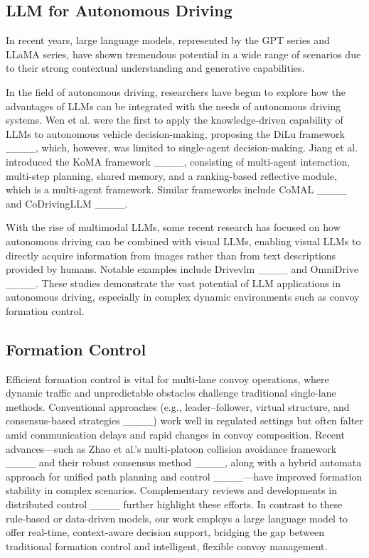 \subsection{LLM for Autonomous Driving} In recent years, large language models, represented by the GPT series and LLaMA series, have shown tremendous potential in a wide range of scenarios due to their strong contextual understanding and generative capabilities.

In the field of autonomous driving, researchers have begun to explore how the advantages of LLMs can be integrated with the needs of autonomous driving systems. Wen et al. were the first to apply the knowledge-driven capability of LLMs to autonomous vehicle decision-making, proposing the DiLu framework ____, which, however, was limited to single-agent decision-making. Jiang et al. introduced the KoMA framework ____, consisting of multi-agent interaction, multi-step planning, shared memory, and a ranking-based reflective module, which is a multi-agent framework. Similar frameworks include CoMAL ____ and CoDrivingLLM ____.

With the rise of multimodal LLMs, some recent research has focused on how autonomous driving can be combined with visual LLMs, enabling visual LLMs to directly acquire information from images rather than from text descriptions provided by humans. Notable examples include Drivevlm ____ and OmniDrive ____. These studies demonstrate the vast potential of LLM applications in autonomous driving, especially in complex dynamic environments such as convoy formation control.

\subsection{Formation Control} Efficient formation control is vital for multi-lane convoy operations, where dynamic traffic and unpredictable obstacles challenge traditional single-lane methods. Conventional approaches (e.g., leader–follower, virtual structure, and consensus-based strategies ____) work well in regulated settings but often falter amid communication delays and rapid changes in convoy composition. Recent advances—such as Zhao et al.'s multi-platoon collision avoidance framework ____ and their robust consensus method ____, along with a hybrid automata approach for unified path planning and control ____—have improved formation stability in complex scenarios. Complementary reviews and developments in distributed control ____ further highlight these efforts. In contrast to these rule-based or data-driven models, our work employs a large language model to offer real-time, context-aware decision support, bridging the gap between traditional formation control and intelligent, flexible convoy management.